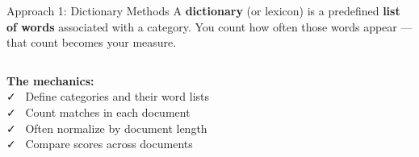 \documentclass[aspectratio=169]{beamer}
\begin{document}
\begin{frame}{Approach 1: Dictionary Methods}
\vspace{0.2cm}
{\small A \textbf{dictionary} (or lexicon) is a predefined \textbf{list of words}
associated with a category. You count how often those words appear ---
that count becomes your measure.}

\medskip
\begin{columns}[T]
  \vspace{0pt}
  {\small\textbf{The mechanics:}}\\[4pt]
  {\small
  \textcolor{wurgreen}{\footnotesize\faCheck}~ Define categories and their word lists\\[4pt]
  \textcolor{wurgreen}{\footnotesize\faCheck}~ Count matches in each document\\[4pt]
  \textcolor{wurgreen}{\footnotesize\faCheck}~ Often normalize by document length\\[4pt]
  \textcolor{wurgreen}{\footnotesize\faCheck}~ Compare scores across documents}

  \vspace{0pt}
\end{columns}
\end{frame}
\end{document}
